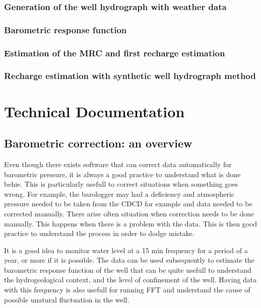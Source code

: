 \documentclass[12pt, letterpaper, fleqn]{report}
\begin{document}
\subsection{Generation of the well hydrograph with weather data}
\subsection{Barometric response function}
\subsection{Estimation of the MRC and first recharge estimation}
\subsection{Recharge estimation with synthetic well hydrograph method}

\chapter{Technical Documentation}

\section{Barometric correction: an overview}

\cite{freeman_use_2004}

Even though there exists software that can correct data automatically for barometric pressure, it is always a good practice to understand what is done behie. This is particularly usefull to correct situations when something goes wrong. For example, the barologger may had a deficiency and atmospheric pressure needed to be taken from the CDCD for example and data needed to be corrected manually. There arise often situation when correction needs to be done manually. This happens when there is a problem with the data. This is then good practice to understand the process in order to dodge mistake.

It is a good idea to monitor water level at a 15 min frequency for a period of a year, or more if it is possible. The data can be used subsequently to estimate the barometric response function of the well that can be quite usefull to understand the hydrogeological context, and the level of confinement of the well. Having data with this frequency is also usefull for running FFT and understand the cause of possible unatural fluctuation in the well.
\end{document}
